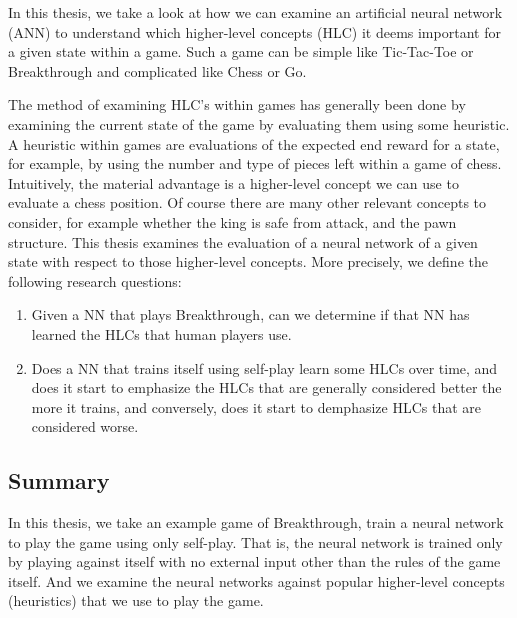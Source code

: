 In this thesis, we take a look at how we can examine an artificial neural network (ANN) to understand which higher-level concepts (HLC) it deems important for a given state within a game. Such a game can be simple like Tic-Tac-Toe or Breakthrough and complicated like Chess or Go.

The method of examining HLC's within games has generally been done by examining the current state of the game by evaluating them using some heuristic. A heuristic within games are evaluations of the expected end reward for a state, for example, by using the number and type of pieces left within a game of chess. Intuitively, the material advantage is a higher-level concept we can use to evaluate a chess position. Of course there are many other relevant concepts to consider, for example whether the king is safe from attack, and the pawn structure. This thesis examines the evaluation of a neural network of a given state with respect to those higher-level concepts. More precisely, we define the following research questions:

\begin{enumerate}
	\item \label{rq:1}Given a NN that plays Breakthrough, can we determine if that NN has learned the HLCs that human players use.
	\item \label{rq:2}Does a NN that trains itself using self-play learn some HLCs over time, and does it start to emphasize
	      the HLCs that are generally considered better the more it trains, and conversely, does it start to
	      demphasize HLCs that are considered worse.
\end{enumerate}

\subsection*{Summary}

In this thesis, we take an example game of Breakthrough, train a neural network to play the game using only self-play. That is, the neural network is trained only by playing against itself with no external input other than the rules of the game itself. And we examine the neural networks against popular higher-level concepts (heuristics) that we use to play the game.
